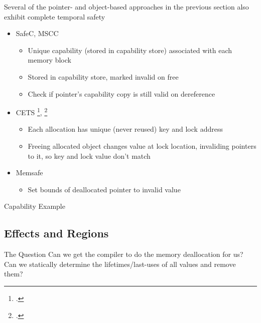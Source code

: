 \documentclass[aspectratio=169]{beamer}
\begin{document}
\begin{frame}
Several of the pointer- and object-based approaches in the previous section also exhibit complete temporal safety
    \begin{itemize}
        \item SafeC, MSCC %
            \begin{itemize}
              \item Unique capability (stored in capability store) associated with each memory block
              \item Stored in capability store, marked invalid on free
              \item Check if pointer's capability copy is still valid on dereference
            \end{itemize}
        \item CETS \footcite{nagarakatte_CETS_2010}, \footcite{nagarakatte_everything_2015}
            \begin{itemize}
                \item Each allocation has unique (never reused) key and lock address 
                \item Freeing allocated object changes value at lock location, invaliding pointers to it, so key and lock value don't match
            \end{itemize}
        \item Memsafe
            \begin{itemize}
                \item Set bounds of deallocated pointer to invalid value %
            \end{itemize}
    \end{itemize}
\end{frame}

\begin{frame}{Capability Example}
\end{frame}

\subsection{Effects and Regions}

\begin{frame}{The Question}
Can we get the \alert{compiler} to do the memory deallocation for us? %
\\
\vspace{0.2in}
Can we statically determine the lifetimes/last-uses of all values and remove them? 
\end{frame}
\end{document}
